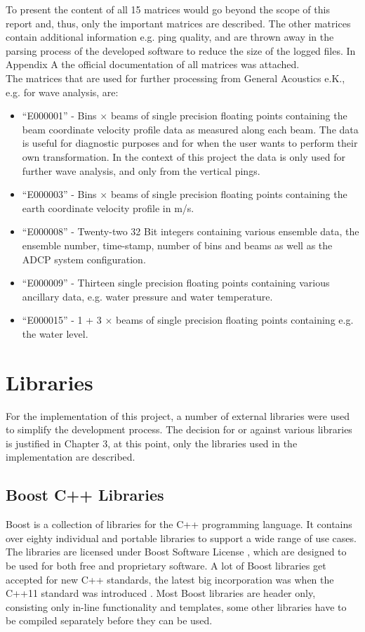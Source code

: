 To present the content of all 15 matrices would go beyond the scope of this report and, thus, only the important matrices are described. The other matrices contain additional information e.g. ping quality, and are thrown away in the parsing process of the developed software to reduce the size of the logged files. In Appendix A the official documentation of all matrices was attached.\\
The matrices that are used for further processing from General Acoustics e.K., e.g. for wave analysis, are:
\begin{itemize}
\item ``E000001'' - Bins $\times$ beams of single precision floating points containing the beam coordinate velocity profile data as measured along each beam. The data is useful for diagnostic purposes and for when the user wants to perform their own transformation. In the context of this project the data is only used for further wave analysis, and only from the vertical pings.
\item``E000003'' - Bins $\times$ beams of single precision floating points containing the earth coordinate velocity profile in m/s. 
\item ``E000008'' - Twenty-two 32 Bit integers containing various ensemble data, the ensemble number, time-stamp, number of bins and beams as well as the ADCP system configuration.
\item ``E000009'' - Thirteen single precision floating points containing various ancillary data, e.g. water pressure and water temperature.
\item ``E000015'' - 1 + 3 $\times$ beams of single precision floating points containing e.g. the water level. 
\end{itemize}

\section{Libraries}
For the implementation of this project, a number of external libraries were used to simplify the development process. The decision for or against various libraries is justified in Chapter 3, at this point, only the libraries used in the implementation are described.
\subsection{Boost C++ Libraries}
Boost \cite{boost} is a collection of libraries for the C++ programming language. It contains over eighty individual and portable libraries to support a wide range of use cases. The libraries are licensed under Boost Software License \cite{boostliz}, which are designed to be used for both free and proprietary software. A lot of Boost libraries get accepted for new C++ standards, the latest big incorporation was when the C++11 standard was introduced \cite{booststd}. Most Boost libraries are header only, consisting only in-line functionality and templates, some other libraries have to be compiled separately before they can be used.

